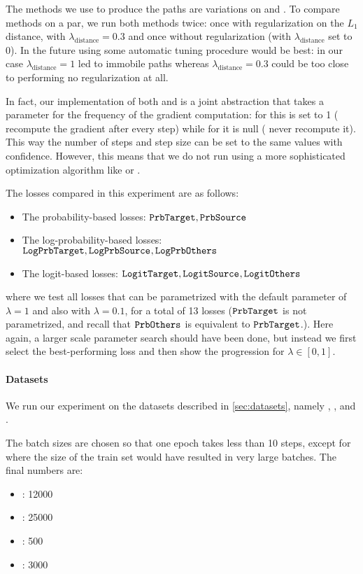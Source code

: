 \documentclass[../main.tex]{subfiles}
\begin{document}
The methods we use to produce the paths are variations on \ls{} and \revise{}.
To compare methods on a par, we run both methods twice: once with regularization on the $L_1$ distance, with $\lambda_\text{distance} = 0.3$ and once without regularization (with $\lambda_\text{distance}$ set to 0).
In the future using some automatic tuning procedure would be best: in our case $\lambda_\text{distance} = 1$ led to immobile paths whereas $\lambda_\text{distance} = 0.3$ could be too close to performing no regularization at all.

In fact, our implementation of both \ls{} and \revise{} is a joint abstraction that takes a parameter for the frequency of the gradient computation: for \revise{} this is set to 1 (\ie{} recompute the gradient after every step) while for \revise{} it is null (\ie{} never recompute it).
This way the number of steps and step size can be set to the same values with confidence.
However, this means that we do not run \revise{} using a more sophisticated optimization algorithm like  or .

The losses compared in this experiment are as follows:
\begin{itemize}
    \item The probability-based losses: $\mathtt{PrbTarget}, \mathtt{PrbSource}_{}$
    \item The log-probability-based losses: $\mathtt{LogPrbTarget}, \mathtt{LogPrbSource}_{}, \mathtt{LogPrbOthers}_{}$
    \item The logit-based losses: $\mathtt{LogitTarget}, \mathtt{LogitSource}_{}, \mathtt{LogitOthers}_{}$
\end{itemize}
where we test all losses that can be parametrized with the default parameter of $\lambda = 1$ and also with $\lambda = 0.1$, for a total of 13 losses ($\mathtt{PrbTarget}$ is not parametrized, and recall that $\mathtt{PrbOthers}_{}$ is equivalent to $\mathtt{PrbTarget}$.).
Here again, a larger scale parameter search should have been done, but instead we first select the best-performing loss and then show the progression for $\lambda \in [0, 1]$.

\paragraph{Datasets}

We run our experiment on the datasets described in \autoref{sec:datasets}, namely \CakeOnSea, \ForestCover, \WineQuality{} and \OnlineNewsPopularity.

The batch sizes are chosen so that one epoch takes less than 10 steps, except for \ForestCover{} where the size of the train set would have resulted in very large batches.
The final numbers are:
\begin{itemize}
    \item \CakeOnSea: 12000
    \item \ForestCover: 25000
    \item \WineQuality: 500
    \item \OnlineNewsPopularity: 3000
\end{itemize}
\end{document}
